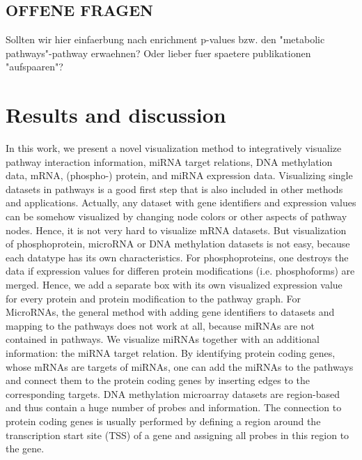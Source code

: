 \documentclass{bioinfo}
\begin{document}
\subsection{OFFENE FRAGEN}

Sollten wir hier einfaerbung nach enrichment p-values bzw. den "metabolic
pathways"-pathway erwaehnen? Oder lieber fuer spaetere publikationen "aufspaaren"?




\section{Results and discussion}




In this work, we present a novel visualization method to integratively visualize pathway interaction information, miRNA target relations, DNA methylation data, mRNA, (phospho-) protein, and miRNA expression data. Visualizing single datasets in pathways is a good first step that is also included in other methods and applications. Actually, any dataset with gene identifiers and expression values can be somehow visualized by changing node colors or other aspects of pathway nodes. Hence, it is not very hard to visualize mRNA datasets. But visualization of phosphoprotein, microRNA or DNA methylation datasets is not easy, because each datatype has its own characteristics. 
For phosphoproteins, one destroys the data if expression values for differen protein modifications (i.e. phosphoforms) are merged. Hence, we add a separate box with its own visualized expression value for every protein and protein modification to the pathway graph.
For MicroRNAs, the general method with adding gene identifiers to datasets and mapping to the pathways does not work at all, because miRNAs are not contained in pathways. We visualize miRNAs together with an additional information: the miRNA target relation. By identifying protein coding genes, whose mRNAs are targets of miRNAs, one can add the miRNAs to the pathways and connect them to the protein coding genes by inserting edges to the corresponding targets.
DNA methylation microarray datasets are region-based and thus contain a huge number of probes and information. The connection to protein coding genes is usually performed by defining a region around the transcription start site (TSS) of a gene and assigning all probes in this region to the gene.
\end{document}
